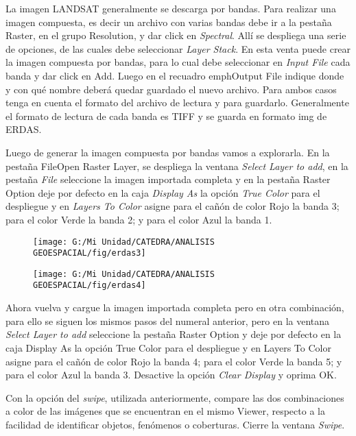 \documentclass[a4paper,oneside,11pt,]{article}
\begin{document}
La imagen LANDSAT generalmente se descarga por bandas. Para realizar una imagen compuesta, es decir un archivo con varias bandas debe ir a la pestaña Raster, en el grupo Resolution, y dar click en \emph{Spectral}. Allí se despliega una serie de opciones, de las cuales debe seleccionar \emph{Layer Stack}. En esta venta puede crear la imagen compuesta por bandas, para lo cual debe seleccionar en \emph{Input File} cada banda y dar click en Add. Luego en el recuadro emph{Output File} indique donde y con qué nombre deberá quedar guardado el nuevo archivo. Para ambos casos tenga en cuenta el formato del archivo de lectura y para guardarlo. Generalmente el formato de lectura de cada banda es TIFF y se guarda en formato img de ERDAS.
\par Luego de generar la imagen compuesta por bandas vamos a explorarla. En la pestaña File\textrightarrow Open \textrightarrow Raster Layer, se despliega la ventana \emph{Select Layer to add}, en la pestaña \emph{File} seleccione la imagen importada completa y en la pestaña Raster Option deje por defecto en la caja \emph{Display As} la opción \emph{True Color} para el despliegue y en \emph{Layers To Color} asigne para el cañón de color Rojo la banda 3; para el color Verde la banda 2; y para el color Azul la  banda 1. 

\begin{figure}
\centering
\texttt{[image: G:/Mi Unidad/CATEDRA/ANALISIS GEOESPACIAL/fig/erdas3]}
\end{figure}

\begin{figure}
\centering
\texttt{[image: G:/Mi Unidad/CATEDRA/ANALISIS GEOESPACIAL/fig/erdas4]}
\end{figure}

Ahora vuelva y cargue la imagen importada completa pero en otra combinación, para ello se siguen los mismos pasos del numeral anterior, pero en la ventana \emph{Select Layer to add} seleccione la pestaña Raster Option y deje por defecto en la caja Display As la opción True Color para el despliegue y en  Layers To Color asigne para el cañón de color Rojo la banda 4; para el color Verde la banda 5; y para el color Azul la  banda 3. Desactive la opción  \emph{Clear Display}  y oprima OK.
\par Con la opción del \emph{swipe}, utilizada anteriormente, compare las dos combinaciones a color de las imágenes que se encuentran en el mismo Viewer, respecto a la facilidad de identificar objetos, fenómenos o coberturas. Cierre la ventana \emph{Swipe}.
\end{document}
